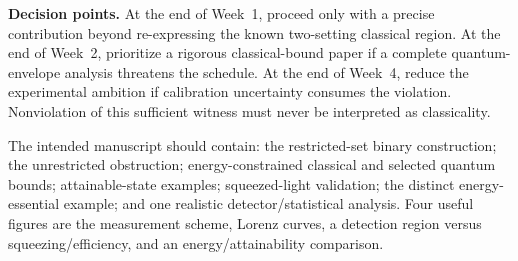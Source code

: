 \documentclass[11pt,a4paper]{article}
\begin{document}
\textbf{Decision points.} At the end of Week~1, proceed only with a precise
contribution beyond re-expressing the known two-setting classical region.
At the end of Week~2, prioritize a rigorous classical-bound paper if a complete
quantum-envelope analysis threatens the schedule. At the end of Week~4, reduce
the experimental ambition if calibration uncertainty consumes the violation.
Nonviolation of this sufficient witness must never be interpreted as classicality.

The intended manuscript should contain: the restricted-set binary construction;
the unrestricted obstruction; energy-constrained classical and selected quantum
bounds; attainable-state examples; squeezed-light validation; the distinct
energy-essential example; and one realistic detector/statistical analysis.
Four useful figures are the measurement scheme, Lorenz curves, a detection
region versus squeezing/efficiency, and an energy/attainability comparison.
\end{document}
